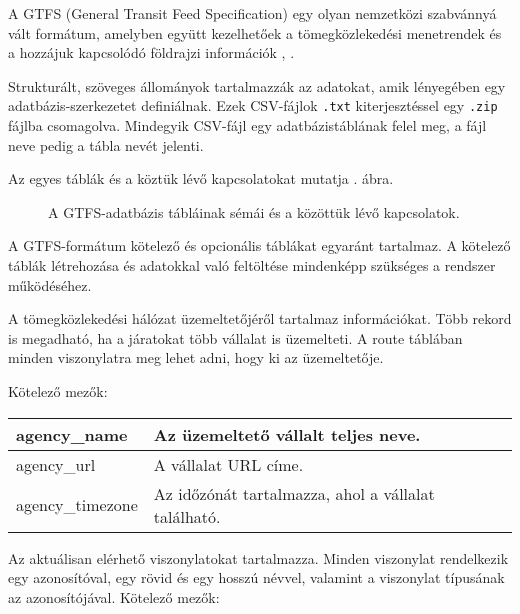 
A GTFS (General Transit Feed Specification) egy olyan nemzetközi szabvánnyá vált formátum, amelyben együtt kezelhetőek a tömegközlekedési menetrendek és a hozzájuk kapcsolódó földrajzi információk \cite{gtfs}, \cite{gtfsspec}.

Strukturált, szöveges állományok tartalmazzák az adatokat, amik lényegében egy adatbázis-szerkezetet definiálnak. Ezek CSV-fájlok \texttt{.txt} kiterjesztéssel egy \texttt{.zip} fájlba csomagolva. Mindegyik CSV-fájl egy adatbázistáblának felel meg, a fájl neve pedig a tábla nevét jelenti.

Az egyes táblák és a köztük lévő kapcsolatokat mutatja . ábra.


\begin{figure}
\centering

\caption{A GTFS-adatbázis tábláinak sémái és a közöttük lévő kapcsolatok.}
\label{fig:gtfs}
\end{figure}

A GTFS-formátum kötelező és opcionális táblákat egyaránt tartalmaz. A kötelező táblák létrehozása és adatokkal való feltöltése mindenképp szükséges a rendszer működéséhez.



A tömegközlekedési hálózat üzemeltetőjéről tartalmaz információkat. Több rekord is megadható, ha a járatokat több vállalat is üzemelteti. A route táblában minden viszonylatra meg lehet adni, hogy ki az üzemeltetője.

Kötelező mezők:

\begin{tabular}{|p{3cm}|p{10cm}|}
\hline
agency\_name & Az üzemeltető vállalt teljes neve. \\
\hline
agency\_url & A vállalat URL címe. \\
\hline
agency\_timezone & Az időzónát tartalmazza, ahol a vállalat található. \\
\hline
\end{tabular}


Az aktuálisan elérhető viszonylatokat tartalmazza. Minden viszonylat rendelkezik egy azonosítóval, egy rövid és egy hosszú névvel, valamint a viszonylat típusának az azonosítójával.
Kötelező mezők:

